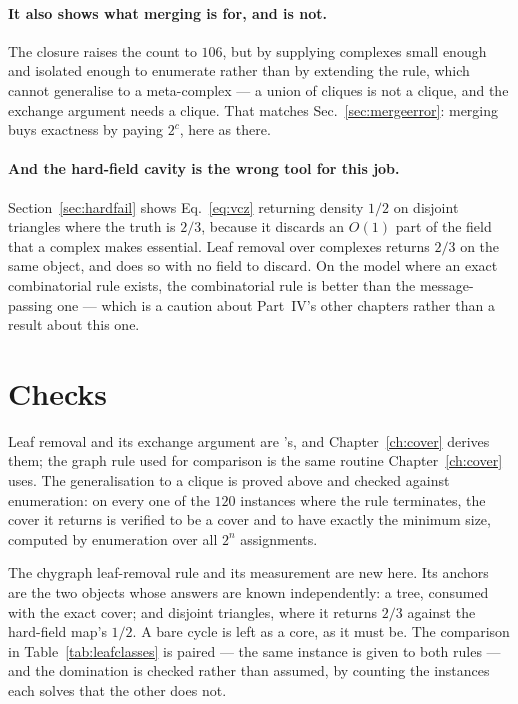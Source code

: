 \paragraph{It also shows what merging is for, and is not.} The closure raises
the count to $106$, but by supplying complexes small enough and isolated enough
to enumerate rather than by extending the rule, which cannot generalise to a
meta-complex --- a union of cliques is not a clique, and the exchange argument
needs a clique. That matches Sec.~\ref{sec:mergeerror}: merging buys exactness
by paying $2^{c}$, here as there.

\paragraph{And the hard-field cavity is the wrong tool for this job.}
Section~\ref{sec:hardfail} shows Eq.~\eqref{eq:vcz} returning density $1/2$ on
disjoint triangles where the truth is $2/3$, because it discards an $O(1)$ part
of the field that a complex makes essential. Leaf removal over complexes returns
$2/3$ on the same object, and does so with no field to discard. On the model
where an exact combinatorial rule exists, the combinatorial rule is better than
the message-passing one --- which is a caution about Part~IV's other chapters
rather than a result about this one.


\section{Checks}
\label{sec:covertri-checks}

Leaf removal and its exchange argument are \citeauthor{bauer2001}'s, and
Chapter~\ref{ch:cover} derives them; the graph rule used for comparison is the
same routine Chapter~\ref{ch:cover} uses. The generalisation to a clique is
proved above and checked against enumeration: on every one of the $120$
instances where the rule terminates, the cover it returns is verified to be a
cover and to have exactly the minimum size, computed by enumeration over all
$2^{n}$ assignments.

The chygraph leaf-removal rule and its measurement are new here. Its anchors are
the two objects whose answers are known independently: a tree, consumed with the
exact cover; and disjoint triangles, where it returns $2/3$ against the
hard-field map's $1/2$. A bare cycle is left as a core, as it must be. The
comparison in Table~\ref{tab:leafclasses} is paired --- the same instance is
given to both rules --- and the domination is checked rather than assumed, by
counting the instances each solves that the other does not.

